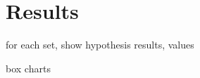 \chapter{Results}\label{ch:results}

\begin{todos}
    \item for each set, show hypothesis results, values
    \item box charts
\end{todos}

